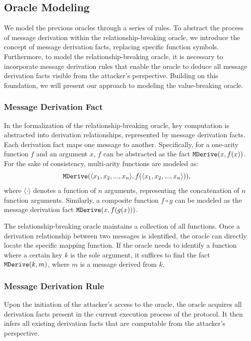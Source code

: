\documentclass[../main.tex]{subfiles}  %
\begin{document}
\subsection{Oracle Modeling} \label{sec:oracle-modeling}

We model the previous oracles through a series of rules.
To abstract the process of message derivation within the relationship-breaking oracle, we introduce the concept of message derivation facts, replacing specific function symbols.
Furthermore, to model the relationship-breaking oracle, it is necessary to incorporate message derivation rules that enable the oracle to deduce all message derivation facts visible from the attacker's perspective.
Building on this foundation, we will present our approach to modeling the value-breaking oracle.

\subsubsection{Message Derivation Fact} In the formalization of the relationship-breaking oracle, key computation is abstracted into derivation relationships, represented by message derivation facts.
Each derivation fact maps one message to another.
Specifically, for a one-arity function $f$ and an argument $x$, $f$ can be abstracted as the fact $\text{{\ttfamily MDerive}}(x, f(x))$.
For the sake of consistency, multi-arity functions are modeled as:
\[
    \text{{\ttfamily MDerive}}(\langle x_1, x_2, ..., x_n \rangle, f(\langle x_1, x_2, ..., x_n \rangle)),
\]
where $\langle \cdot \rangle$ denotes a function of $n$ arguments, representing the concatenation of $n$ function arguments.
Similarly, a composite function $f \circ g$ can be modeled as the message derivation fact $\text{{\ttfamily MDerive}}(x, f(g(x)))$.

The relationship-breaking oracle maintains a collection of all functions.
Once a derivation relationship between two messages is identified, the oracle can directly locate the specific mapping function.
If the oracle needs to identify a function where a certain key $k$ is the sole argument, it suffices to find the fact $\text{{\ttfamily MDerive}}(k, m)$,
where $m$ is a message derived from $k$.

\subsubsection{Message Derivation Rule}  
Upon the initiation of the attacker's access to the oracle, the oracle acquires all derivation facts present in the current execution process of the protocol.
It then infers all existing derivation facts that are computable from the attacker's perspective.
\end{document}
